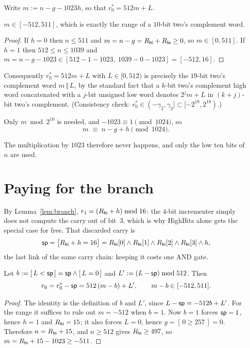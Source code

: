 Write $m:=n-g-1023h$, so that $r_0^{*}=512m+L$.

\begin{lemma}[range]\label{lem:range}
$m\in[-512,511]$, which is exactly the range of a $10$-bit two's complement
word.
\end{lemma}

\begin{proof}
If $h=0$ then $n\le511$ and $m=n-g=R_{\mathsf{hi}}+R_{\mathsf{lo}}\ge0$, so $m\in[0,511]$.
If $h=1$ then $512\le n\le1039$ and
$m=n-g-1023\in[512-1-1023,\;1039-0-1023]=[-512,16]$.
\end{proof}

Consequently $r_0^{*}=512m+L$ with $L\in[0,512)$ is precisely the $19$-bit
two's complement word $m\,\Vert\,L$, by the standard fact that a $k$-bit two's
complement high word concatenated with a $j$-bit unsigned low word denotes
$2^{j}m+L$ in $(k+j)$-bit two's complement. (Consistency check:
$r_0^{*}\in(-\gamma_2,\gamma_2]\subset[-2^{18},2^{18})$.)

\begin{corollary}\label{cor:1023}
Only $m\bmod 2^{10}$ is needed, and $-1023\equiv1\pmod{1024}$, so
\[
  m\;\equiv\;n-g+h \pmod{1024}.
\]
\end{corollary}

The multiplication by $1023$ therefore never happens, and only the low ten bits
of $n$ are used.

\section{Paying for the branch}

By Lemma~\ref{lem:branch}, $r_1=(R_{\mathsf{hi}}+h)\bmod16$: the $4$-bit incrementer simply
does not compute the carry out of bit~$3$, which is why \textsf{HighBits} alone
gets the special case for free. That discarded carry is
\[
  \mathsf{sp}=\big[R_{\mathsf{hi}}+h=16\big]=R_{\mathsf{hi}}[0]\wedge R_{\mathsf{hi}}[1]\wedge R_{\mathsf{hi}}[2]\wedge R_{\mathsf{hi}}[3]\wedge h,
\]
the last link of the same carry chain: keeping it costs one AND gate.

\begin{lemma}\label{lem:borrow}
Let $b:=[\,L<\mathsf{sp}\,]=\mathsf{sp}\wedge[\,L=0\,]$ and $L':=(L-\mathsf{sp})\bmod 512$. Then
\[
  r_0=r_0^{*}-\mathsf{sp}=512\,(m-b)+L',\qquad m-b\in[-512,511].
\]
\end{lemma}

\begin{proof}
The identity is the definition of $b$ and $L'$, since
$L-\mathsf{sp}=-512b+L'$. For the range it suffices to rule out $m=-512$ when $b=1$.
Now $b=1$ forces $\mathsf{sp}=1$, hence $h=1$ and $R_{\mathsf{hi}}=15$; it also forces $L=0$,
hence $g=[\,0\ge257\,]=0$. Therefore $n=R_{\mathsf{lo}}+15$, and $n\ge512$ gives
$R_{\mathsf{lo}}\ge497$, so $m=R_{\mathsf{lo}}+15-1023\ge-511$.
\end{proof}


